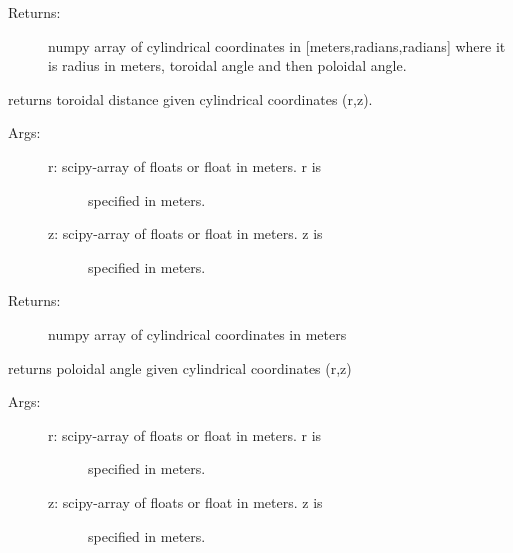 \documentclass[letterpaper,10pt,english]{sphinxmanual}
\begin{document}
\begin{fulllineitems}
\begin{fulllineitems}
\begin{description}
\item[{Returns:}] \leavevmode
numpy array of cylindrical coordinates in {[}meters,radians,radians{]}
where it is radius in meters, toroidal angle and then poloidal angle.

\end{description}

\end{fulllineitems}


\begin{fulllineitems}
\label{TRIPPy:TRIPPy.geometry.Vec.t0}
returns toroidal distance given cylindrical
coordinates (r,z).
\begin{description}
\item[{Args:}] \leavevmode\begin{description}
\item[{r: scipy-array of floats or float in meters. r is}] \leavevmode
specified in meters.

\item[{z: scipy-array of floats or float in meters. z is}] \leavevmode
specified in meters.

\end{description}

\item[{Returns:}] \leavevmode
numpy array of cylindrical coordinates in meters

\end{description}

\end{fulllineitems}


\begin{fulllineitems}
\label{TRIPPy:TRIPPy.geometry.Vec.t2}
returns poloidal angle given cylindrical
coordinates (r,z)
\begin{description}
\item[{Args:}] \leavevmode\begin{description}
\item[{r: scipy-array of floats or float in meters. r is}] \leavevmode
specified in meters.

\item[{z: scipy-array of floats or float in meters. z is}] \leavevmode
specified in meters.


\end{description}
\end{description}
\end{fulllineitems}
\end{fulllineitems}
\end{document}
